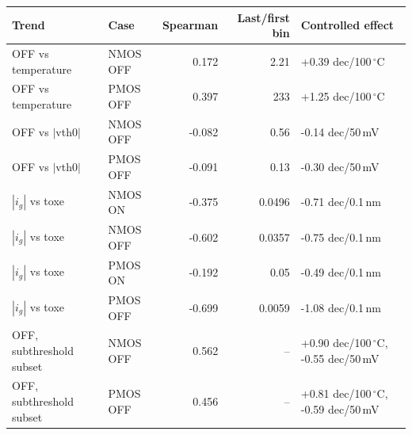 \begin{tabular}{llrrl}
\toprule
Trend & Case & Spearman & Last/first bin & Controlled effect \\
\midrule
OFF vs temperature & NMOS OFF & 0.172 & 2.21 & +0.39 dec/100\,$^{\circ}$C \\
OFF vs temperature & PMOS OFF & 0.397 & 233 & +1.25 dec/100\,$^{\circ}$C \\
\midrule
OFF vs $|$vth0$|$ & NMOS OFF & -0.082 & 0.56 & -0.14 dec/50\,mV \\
OFF vs $|$vth0$|$ & PMOS OFF & -0.091 & 0.13 & -0.30 dec/50\,mV \\
\midrule
$|i_g|$ vs toxe & NMOS ON & -0.375 & 0.0496 & -0.71 dec/0.1\,nm \\
$|i_g|$ vs toxe & NMOS OFF & -0.602 & 0.0357 & -0.75 dec/0.1\,nm \\
$|i_g|$ vs toxe & PMOS ON & -0.192 & 0.05 & -0.49 dec/0.1\,nm \\
$|i_g|$ vs toxe & PMOS OFF & -0.699 & 0.0059 & -1.08 dec/0.1\,nm \\
\midrule
OFF, subthreshold subset & NMOS OFF & 0.562 & -- & +0.90 dec/100\,$^{\circ}$C, -0.55 dec/50\,mV \\
OFF, subthreshold subset & PMOS OFF & 0.456 & -- & +0.81 dec/100\,$^{\circ}$C, -0.59 dec/50\,mV \\
\bottomrule
\end{tabular}
